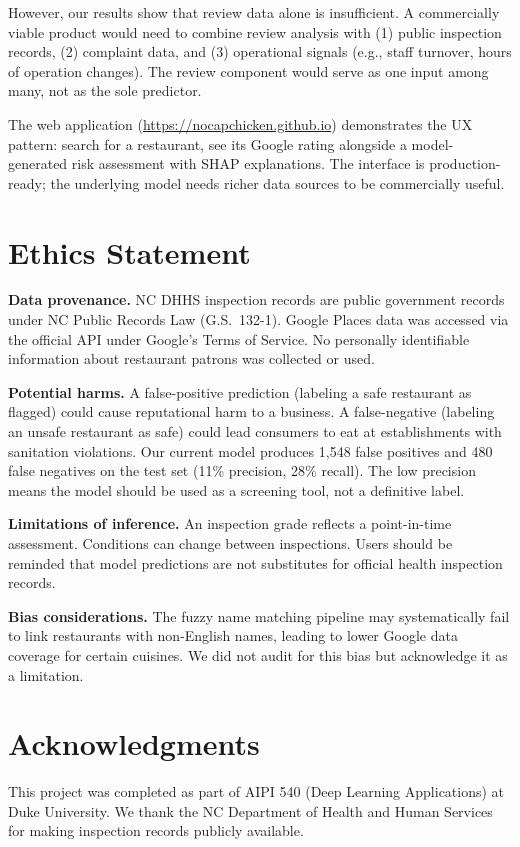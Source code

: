 \documentclass{article}
\begin{document}
However, our results show that review data alone is insufficient. A commercially viable product would need to combine review analysis with (1) public inspection records, (2) complaint data, and (3) operational signals (e.g., staff turnover, hours of operation changes). The review component would serve as one input among many, not as the sole predictor.

The web application (\url{https://nocapchicken.github.io}) demonstrates the UX pattern: search for a restaurant, see its Google rating alongside a model-generated risk assessment with SHAP explanations. The interface is production-ready; the underlying model needs richer data sources to be commercially useful.

\section{Ethics Statement}

\textbf{Data provenance.} NC DHHS inspection records are public government records under NC Public Records Law (G.S.\ 132-1). Google Places data was accessed via the official API under Google's Terms of Service. No personally identifiable information about restaurant patrons was collected or used.

\textbf{Potential harms.} A false-positive prediction (labeling a safe restaurant as flagged) could cause reputational harm to a business. A false-negative (labeling an unsafe restaurant as safe) could lead consumers to eat at establishments with sanitation violations. Our current model produces 1,548 false positives and 480 false negatives on the test set (11\% precision, 28\% recall). The low precision means the model should be used as a screening tool, not a definitive label.

\textbf{Limitations of inference.} An inspection grade reflects a point-in-time assessment. Conditions can change between inspections. Users should be reminded that model predictions are not substitutes for official health inspection records.

\textbf{Bias considerations.} The fuzzy name matching pipeline may systematically fail to link restaurants with non-English names, leading to lower Google data coverage for certain cuisines. We did not audit for this bias but acknowledge it as a limitation.

\section*{Acknowledgments}

This project was completed as part of AIPI 540 (Deep Learning Applications) at Duke University. We thank the NC Department of Health and Human Services for making inspection records publicly available.



\end{document}
